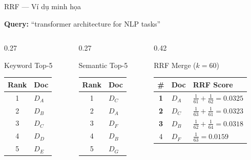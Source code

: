 \documentclass[aspectratio=169, 11pt]{beamer}
\begin{document}
\begin{frame}{RRF --- Ví dụ minh họa}

\textbf{Query:} ``transformer architecture for NLP tasks''

\vspace{0.3cm}

\begin{columns}[T]
\begin{column}{0.27\textwidth}
\begin{block}{\small\textcolor{accentBlue}{Keyword Top-5}}
\centering
{\small
\begin{tabular}{cl}
\textbf{Rank} & \textbf{Doc} \\
\hline
1 & $D_A$ \\
2 & $D_B$ \\
3 & $D_C$ \\
4 & $D_D$ \\
5 & $D_E$ \\
\end{tabular}
}
\end{block}
\end{column}

\begin{column}{0.27\textwidth}
\begin{block}{\small\textcolor{accentOrange}{Semantic Top-5}}
\centering
{\small
\begin{tabular}{cl}
\textbf{Rank} & \textbf{Doc} \\
\hline
1 & $D_C$ \\
2 & $D_A$ \\
3 & $D_F$ \\
4 & $D_B$ \\
5 & $D_G$ \\
\end{tabular}
}
\end{block}
\end{column}

\begin{column}{0.42\textwidth}
\begin{exampleblock}{\small\textcolor{accentTeal}{RRF Merge} ($k=60$)}
\centering
{\small
\begin{tabular}{cll}
\textbf{\#} & \textbf{Doc} & \textbf{RRF Score} \\
\hline
\textbf{1} & $D_A$ & $\frac{1}{61} {+} \frac{1}{62} = \mathbf{0.0325}$ \\[3pt]
\textbf{2} & $D_C$ & $\frac{1}{63} {+} \frac{1}{61} = 0.0323$ \\[3pt]
\textbf{3} & $D_B$ & $\frac{1}{62} {+} \frac{1}{64} = 0.0318$ \\[3pt]
4 & $D_F$ & $\frac{1}{63} = 0.0159$ \\
\end{tabular}
}
\end{exampleblock}
\end{column}
\end{columns}


\end{frame}
\end{document}

